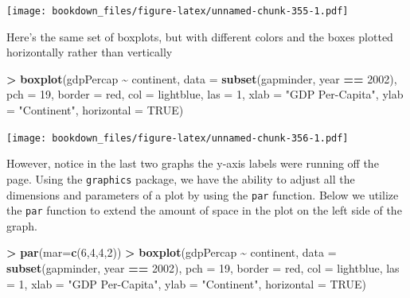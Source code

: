\documentclass[
]{krantz}
\makeatletter
\newenvironment{Shaded}{\begin{snugshade}}{\end{snugshade}}
\newcommand{\DataTypeTok}[1]{\textcolor[rgb]{0.27,0.27,0.27}{#1}}
\newcommand{\DecValTok}[1]{\textcolor[rgb]{0.06,0.06,0.06}{#1}}
\newcommand{\KeywordTok}[1]{\textcolor[rgb]{0.27,0.27,0.27}{\textbf{#1}}}
\newcommand{\NormalTok}[1]{#1}
\newcommand{\OperatorTok}[1]{\textcolor[rgb]{0.43,0.43,0.43}{\textbf{#1}}}
\newcommand{\OtherTok}[1]{\textcolor[rgb]{0.37,0.37,0.37}{#1}}
\newcommand{\StringTok}[1]{\textcolor[rgb]{0.5,0.5,0.5}{#1}}
\newenvironment{kframe}{%
\medskip{}
\setlength{\fboxsep}{.8em}
 \def\at@end@of@kframe{}%
 \ifinner\ifhmode%
  \def\at@end@of@kframe{\end{minipage}}%
  \begin{minipage}{\columnwidth}%
 \fi\fi%
 \def\FrameCommand##1{\hskip\@totalleftmargin \hskip-\fboxsep
 \colorbox{shadecolor}{##1}\hskip-\fboxsep
     \hskip-\linewidth \hskip-\@totalleftmargin \hskip\columnwidth}%
 \MakeFramed {\advance\hsize-\width
   \@totalleftmargin\z@ \linewidth\hsize
   \@setminipage}}%
 {\par\unskip\endMakeFramed%
 \at@end@of@kframe}
\renewenvironment{Shaded}{\begin{kframe}}{\end{kframe}}
\makeatother
\begin{document}
\texttt{[image: bookdown\_files/figure-latex/unnamed-chunk-355-1.pdf]}

Here's the same set of boxplots, but with different colors and the boxes plotted horizontally rather than vertically

\begin{Shaded}
\begin{Highlighting}[]
\OperatorTok{\textgreater{}}\StringTok{ }\KeywordTok{boxplot}\NormalTok{(gdpPercap }\OperatorTok{\textasciitilde{}}\StringTok{ }\NormalTok{continent, }\DataTypeTok{data =} \KeywordTok{subset}\NormalTok{(gapminder, year }\OperatorTok{==}\StringTok{ }\DecValTok{2002}\NormalTok{), }\DataTypeTok{pch =} \DecValTok{19}\NormalTok{, }\DataTypeTok{border =} \StringTok{\textquotesingle{}red\textquotesingle{}}\NormalTok{, }\DataTypeTok{col =} \StringTok{\textquotesingle{}lightblue\textquotesingle{}}\NormalTok{, }\DataTypeTok{las =} \DecValTok{1}\NormalTok{, }\DataTypeTok{xlab =} \StringTok{"GDP Per{-}Capita"}\NormalTok{, }\DataTypeTok{ylab =} \StringTok{"Continent"}\NormalTok{, }\DataTypeTok{horizontal =} \OtherTok{TRUE}\NormalTok{)}
\end{Highlighting}
\end{Shaded}

\texttt{[image: bookdown\_files/figure-latex/unnamed-chunk-356-1.pdf]}

However, notice in the last two graphs the y-axis labels were running off the page. Using the \texttt{graphics} package, we have the ability to adjust all the dimensions and parameters of a plot by using the \texttt{par} function. Below we utilize the \texttt{par} function to extend the amount of space in the plot on the left side of the graph.

\begin{Shaded}
\begin{Highlighting}[]
\OperatorTok{\textgreater{}}\StringTok{ }\KeywordTok{par}\NormalTok{(}\DataTypeTok{mar=}\KeywordTok{c}\NormalTok{(}\DecValTok{6}\NormalTok{,}\DecValTok{4}\NormalTok{,}\DecValTok{4}\NormalTok{,}\DecValTok{2}\NormalTok{))}
\OperatorTok{\textgreater{}}\StringTok{ }\KeywordTok{boxplot}\NormalTok{(gdpPercap }\OperatorTok{\textasciitilde{}}\StringTok{ }\NormalTok{continent, }\DataTypeTok{data =} \KeywordTok{subset}\NormalTok{(gapminder, year }\OperatorTok{==}\StringTok{ }\DecValTok{2002}\NormalTok{), }\DataTypeTok{pch =} \DecValTok{19}\NormalTok{, }\DataTypeTok{border =} \StringTok{\textquotesingle{}red\textquotesingle{}}\NormalTok{, }\DataTypeTok{col =} \StringTok{\textquotesingle{}lightblue\textquotesingle{}}\NormalTok{, }\DataTypeTok{las =} \DecValTok{1}\NormalTok{, }\DataTypeTok{xlab =} \StringTok{"GDP Per{-}Capita"}\NormalTok{, }\DataTypeTok{ylab =} \StringTok{"Continent"}\NormalTok{, }\DataTypeTok{horizontal =} \OtherTok{TRUE}\NormalTok{)}
\end{Highlighting}
\end{Shaded}
\end{document}
